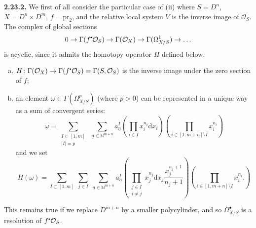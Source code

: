 \documentclass{report}
\newenvironment{rmenv}[1]
  {\phantomsection\par\medskip\noindent\textbf{#1.}\rmfamily}
  {\medskip}
\renewcommand{\cal}[1]{{\mathcal{#1}}}
\newcommand{\sbullet}{{\mathbin{\vcenter{\hbox{\scalebox{.5}{$\bullet$}}}}}}
\newcommand{\NN}{\mathbb{N}}
\newcommand{\dd}{\mathrm{d}}
\newcommand{\pr}{\mathrm{pr}}
\newcommand{\oldpage}[1]{\marginpar{\footnotesize$\Big\vert$ \textit{p.~#1}}}
\begin{document}
\begin{rmenv}{2.23.2}
\label{I.2.23.2}
  We first of all consider the particular case of (ii) where $S=D^n$, $X=D^n\times D^m$, $f=\pr_2$, and the relative local system $V$ is the inverse image of $\cal{O}_S$.
  The complex of global sections
  \[
    0 \to \Gamma(f^\sbullet\cal{O}_S) \to \Gamma(\cal{O}_X) \to \Gamma(\Omega_{X/S}^1) \to \ldots
  \]
  is acyclic, since it admits the homotopy operator $H$ defined below.
\oldpage{16}
  \begin{enumerate}[a)]
    \item $H\colon \Gamma(\cal{O}_X) \to \Gamma(f^\sbullet\cal{O}_S) = \Gamma(S,\cal{O}_S)$ is the inverse image under the zero section of $f$;
    \item an element $\omega\in\Gamma(\Omega_{X/S}^p)$ (where $p>0$) can be represented in a unique way as a sum of convergent series:
      \[
        \omega = \sum_{\substack{I\subset[1,m]\\|I|=p}} \; \sum_{\underline{n}\in \NN^{m+n}} a_{\underline{n}}^I
        \left(
          \prod_{i\in I} x_i^{n_i}\dd x_i
        \right)
        \left(
          \prod_{i\in[1,m+n]\setminus I} x_i^{n_i}
        \right)
      \]
      and we set
      \[
        H(\omega) = \sum_{I\subset[1,m]} \; \sum_{j\in I} \; \sum_{\underline{n}\in\NN^{m+n}} a_{\underline{n}}^I
        \left(
          \prod_{\substack{j\in I\\i\neq j}} x_j^{n_j}\dd x_j \frac{x_j^{n_j+1}}{n_j+1}
        \right)
        \left(
          \prod_{i\in[1,m+n]\setminus I} x_i^{n_i}.
        \right)
      \]
  \end{enumerate}

  This remains true if we replace $D^{m+n}$ by a smaller polycylinder, and so $\Omega_{X/S}^\bullet$ is a resolution of $f^\sbullet\cal{O}_S$.
\end{rmenv}
\end{document}
